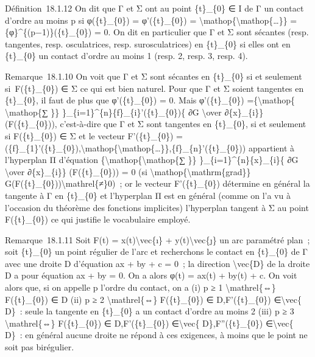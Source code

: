 \documentclass[]{article}
\begin{document}
Définition~18.1.12 On dit que Γ et Σ ont au point \{t\}\_\{0\} ∈ I de Γ
un contact d'ordre au moins p si φ(\{t\}\_\{0\}) = φ'(\{t\}\_\{0\}) =
\textbackslash{}mathop\{\textbackslash{}mathop\{\ldots{}\}\} =
\{φ\}\^{}\{(p−1)\}(\{t\}\_\{0\}) = 0. On dit en particulier que Γ et Σ
sont sécantes (resp. tangentes, resp. osculatrices, resp.
surosculatrices) en \{t\}\_\{0\} si elles ont en \{t\}\_\{0\} un contact
d'ordre au moins 1 (resp. 2, resp. 3, resp. 4).

Remarque~18.1.10 On voit que Γ et Σ sont sécantes en \{t\}\_\{0\} si et
seulement si~F(\{t\}\_\{0\}) ∈ Σ ce qui est bien naturel. Pour que Γ et
Σ soient tangentes en \{t\}\_\{0\}, il faut de plus que φ'(\{t\}\_\{0\})
= 0. Mais φ'(\{t\}\_\{0\}) =\{\textbackslash{}mathop\{
\textbackslash{}mathop\{∑ \}\}
\}\_\{i=1\}\^{}\{n\}\{f\}\_\{i\}'(\{t\}\_\{0\})\{ ∂G
\textbackslash{}over ∂\{x\}\_\{i\}\} (F(\{t\}\_\{0\})), c'est-à-dire que
Γ et Σ sont tangentes en \{t\}\_\{0\}, si et seulement si
F(\{t\}\_\{0\}) ∈ Σ et le vecteur F'(\{t\}\_\{0\}) =
(\{f\}\_\{1\}'(\{t\}\_\{0\}),\textbackslash{}mathop\{\textbackslash{}mathop\{\ldots{}\}\},\{f\}\_\{n\}'(\{t\}\_\{0\}))
appartient à l'hyperplan Π d'équation
\{\textbackslash{}mathop\{\textbackslash{}mathop\{∑ \}\}
\}\_\{i=1\}\^{}\{n\}\{x\}\_\{i\}\{ ∂G \textbackslash{}over
∂\{x\}\_\{i\}\} (F(\{t\}\_\{0\})) = 0 (si
\textbackslash{}mathop\{\textbackslash{}mathrm\{grad\}\}
G(F(\{t\}\_\{0\}))\textbackslash{}mathrel\{≠\}0)~; or le vecteur
F'(\{t\}\_\{0\}) détermine en général la tangente à Γ en \{t\}\_\{0\} et
l'hyperplan Π est en général (comme on l'a vu à l'occasion du théorème
des fonctions implicites) l'hyperplan tangent à Σ au point
F(\{t\}\_\{0\}) ce qui justifie le vocabulaire employé.

Remarque~18.1.11 Soit F(t) = x(t)\textbackslash{}vec\{ı\} +
y(t)\textbackslash{}vec\{ȷ\} un arc paramétré plan~; soit \{t\}\_\{0\}
un point régulier de l'arc et recherchons le contact en \{t\}\_\{0\} de
Γ avec une droite D d'équation ax + by + c = 0~; la direction
\textbackslash{}vec\{D\} de la droite D a pour équation ax + by = 0. On
a alors φ(t) = ax(t) + by(t) + c. On voit alors que, si on appelle p
l'ordre du contact, on a (i) p ≥ 1 \textbackslash{}mathrel\{⇔\}
F(\{t\}\_\{0\}) ∈ D (ii) p ≥ 2 \textbackslash{}mathrel\{⇔\}
F(\{t\}\_\{0\}) ∈ D,F'(\{t\}\_\{0\}) ∈\textbackslash{}vec\{ D\}~: seule
la tangente en \{t\}\_\{0\} a un contact d'ordre au moins 2 (iii) p ≥ 3
\textbackslash{}mathrel\{⇔\} F(\{t\}\_\{0\}) ∈ D,F'(\{t\}\_\{0\})
∈\textbackslash{}vec\{ D\},F''(\{t\}\_\{0\}) ∈\textbackslash{}vec\{
D\}~: en général aucune droite ne répond à ces exigences, à moins que le
point ne soit pas birégulier.
\end{document}
